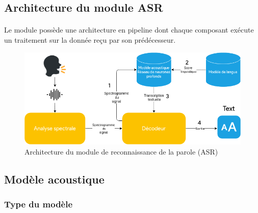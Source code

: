 	\subsection{Architecture du module ASR}
	\paragraph{}
	Le module possède une architecture en pipeline dont chaque composant exécute un traitement sur la donnée reçu par son prédécesseur.
	\begin{figure}[H] 
		\centering
		\includegraphics[width=0.88\linewidth]{images/Conception/ASR/schema.png}
		\caption{Architecture du module de reconnaissance de la parole (ASR)}
	\end{figure}
	\subsection{Modèle acoustique}
		\subsubsection*{Type du modèle}
